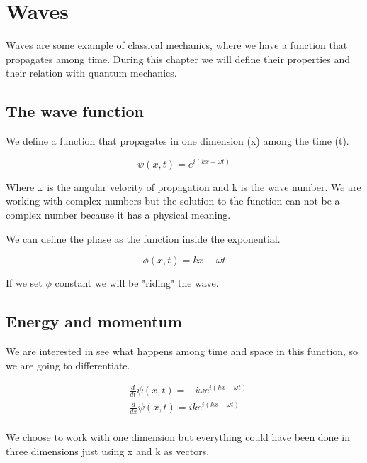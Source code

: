 \setchapterpreamble[u]{\margintoc}
\chapter{Waves}

Waves are some example of classical mechanics, where we have a function that propagates among time. During this chapter we will define their properties and their relation with quantum mechanics.

\section{The wave function}

We define a function that propagates in one dimension (x) among the time (t).

\begin{equation}
\label{wave_function}
    \psi(x,t) = e^{i(kx-\omega t)} 
\end{equation}

Where $\omega$ is the angular velocity of propagation and k is the wave number. We are working with complex numbers but the solution to the function can not be a complex number because it has a physical meaning.


We can define the phase as the function inside the exponential.

\begin{equation}
    \label{phase_def}
    \phi(x,t) = kx-\omega t
\end{equation}

If we set $\phi$ constant we will be "riding" the wave.

\section{Energy and momentum}

We are interested in see what happens among time and space in this function, so we are going to differentiate.

\begin{equation}
    \label{diff_wave}
    \begin{split}
        &\frac{d}{dt}\psi(x,t) = -i\omega e^{i(kx-\omega t)}\\
        &\frac{d}{dx}\psi(x,t) = ik e^{i(kx-\omega t)}\\
    \end{split}
\end{equation}

We choose to work with one dimension but everything could have been done in three dimensions just using x and k as vectors.

